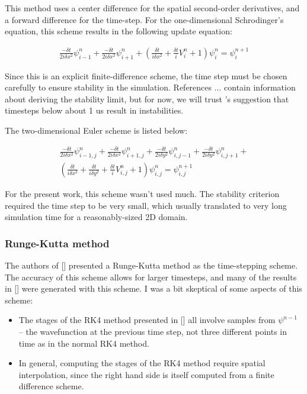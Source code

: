 \documentclass[letterpaper,12pt]{article}
\begin{document}
This method uses a center difference for the spatial second-order derivatives, and a forward difference for the time-step.  For the one-dimensional Schrodinger's equation, this scheme results in the following update equation:

\begin{equation}
\begin{split}
\frac{-\delta t}{2i\delta x^2}\psi^n_{i-1} + 
\frac{-\delta t}{2i\delta x^2}\psi^n_{i+1} +
( \frac{\delta t}{i\delta x^2} + \frac{\delta t} {i}V^n_{i} + 1)\psi^n_{i}  = \psi^{n+1}_{i} 
\end{split}
\end{equation}

Since this is an explicit finite-difference scheme, the time step must be chosen carefully to ensure stability in the simulation.  References ... contain information about deriving the stability limit, but for now, we will trust 's suggestion that timesteps below about 1 us result in instabilities. 

The two-dimensional Euler scheme is listed below:


\begin{equation}
\begin{split}
\frac{-\delta t}{2i\delta x^2}\psi^n_{i-1,j} + 
\frac{-\delta t}{2i\delta x^2}\psi^n_{i+1,j} +
\frac{-\delta t}{2i\delta y^2}\psi^n_{i,j-1} + 
 \frac{-\delta t}{2i\delta y^2}\psi^n_{i,j+1} + \\ 
(  \frac{\delta t}{i\delta x^2} + \frac{\delta t}{i\delta y^2} + \frac{\delta t} {i}V^n_{i,j} + 1)\psi^n_{i,j}  = \psi^{n+1}_{i,j} 
\end{split}
\end{equation}

For the present work, this scheme wasn't used much.  The stability criterion required the time step to be very small, which usually translated to very long simulation time for a reasonably-sized 2D domain.

\subsubsection{Runge-Kutta method}

The authors of [] presented a Runge-Kutta method as the time-stepping scheme.  The accuracy of this scheme allows for larger timesteps, and many of the results in [] were generated with this scheme.
I was a bit skeptical of some aspects of this scheme:

\begin{itemize}
  \item The stages of the RK4 method presented in [] all involve samples from $\psi^{n-1}$ -- the wavefunction at the previous time step, not three different points in time as in the normal RK4 method. 
  \item In general, computing the stages of the RK4 method require spatial interpolation, since the right hand side is itself computed from a finite difference scheme.
\end{itemize}
\end{document}
